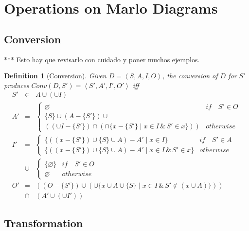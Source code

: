 \documentclass{article}
\newtheorem{definition}{Definition}
\newcommand{\cred}[1]{{\color{red}#1}}
\begin{document}
\section{Operations on Marlo Diagrams}

\subsection{Conversion}

\cred{*** Esto hay que revisarlo con cuidado y poner muchos ejemplos.}

\begin{definition}[Conversion]
Given $D=\left< S, A, I, O\right>$, the conversion of $D$ for $S'$ produces 
$Conv(D,S')=\left<S', A', I', O'\right>$ iff
\begin{eqnarray*}
S' & \in & A \cup (\cup I)\\
A' & = & \left\{ 
\begin{array}{ll}
    \varnothing &  if \quad S'\in O\\
    \{S\}\cup (A -\{S'\})\cup &\\
    ((\cup I-\{S'\})\cap (\cap \{x -\{S'\}\mid x\in I\, \& \, S'\in x\}))& otherwise
\end{array}
\right.\\
I' &=& \left\{
\begin{array}{ll}
    \{((x-\{S'\})\cup \{S\}\cup A)- A' \mid x\in I\} & if\quad S'\in A \\
    \{((x-\{S'\})\cup \{S\} \cup A)- A' \mid x\in I\, \& \, S'\in x \} & otherwise
\end{array}
\right.\\
& \cup & \left\{
\begin{array}{ll}
    \{\varnothing\} & if\quad S'\in O \\
    \varnothing &  otherwise
\end{array}
\right.\\
O' &=& \left((O-\{S'\}) \cup (\cup \{x\cup A \cup \{S\} \mid x\in I \, \& \, S'\notin (x\cup A)\})\right)\\
& \cap & (A' \cup (\cup I'))
\end{eqnarray*}
\end{definition}

\subsection{Transformation}
\end{document}

